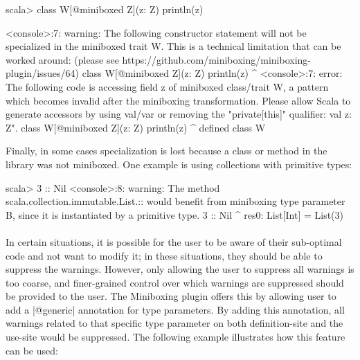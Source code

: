 \begin{lstlisting-nobreak}
scala> class W[@miniboxed Z](z: Z) { println(z) }

<console>:7: warning: The following constructor statement will not be
specialized in the miniboxed trait W. This is a technical limitation
that can be worked around: (please see
https://github.com/miniboxing/miniboxing-plugin/issues/64)
       class W[@miniboxed Z](z: Z) { println(z) }
                                            ^
<console>:7: error: The following code is accessing field z of miniboxed
class/trait W, a pattern which becomes invalid after the miniboxing
transformation. Please allow Scala to generate accessors by using val/var
or removing the "private[this]" qualifier: val z: Z".
       class W[@miniboxed Z](z: Z) { println(z) }
                                             ^
defined class W
\end{lstlisting-nobreak}
Finally, in some cases specialization is lost because a class or method in the library was not miniboxed. One example is using collections with primitive types:

\begin{lstlisting-nobreak}
scala> 3 :: Nil
<console>:8: warning: The method scala.collection.immutable.List.::
would benefit from miniboxing type parameter B, since it is 
instantiated by a primitive type.
              3 :: Nil
                ^
res0: List[Int] = List(3)
\end{lstlisting-nobreak}

\paragraph{}
In certain situations, it is possible for the user to be aware of their sub-optimal code and not want to modify it; in these situations, they should be able to suppress the warnings. However, only allowing the user to suppress all warnings is too coarse, and finer-grained control over which warnings are suppressed should be provided to the user. The Miniboxing plugin offers this by allowing user to add a |@generic| annotation for type parameters. By adding this annotation, all warnings related to that specific type parameter on both definition-site and the use-site would be suppressed. The following example illustrates how this feature can be used: 

